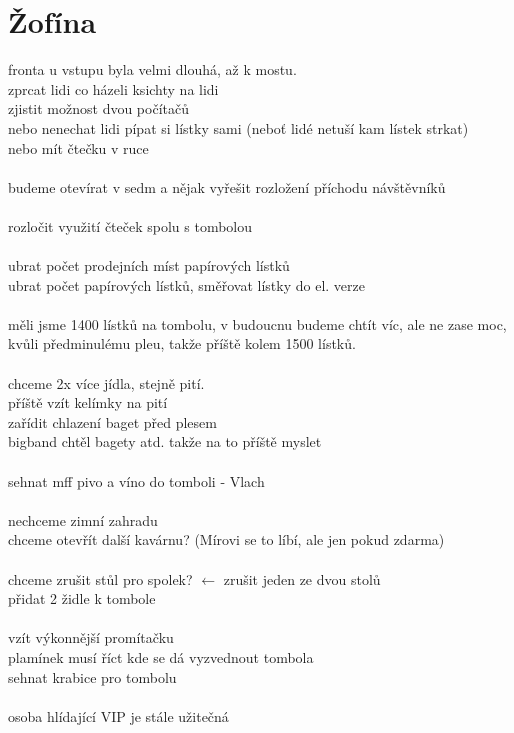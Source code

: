 \documentclass[10pt,a4paper]{article}
\begin{document}
\section{Žofína}
fronta u vstupu byla velmi dlouhá, až k mostu.\\
zprcat lidi co házeli ksichty na lidi\\
zjistit možnost dvou počítačů\\
nebo nenechat lidi pípat si lístky sami
(neboť lidé netuší kam lístek strkat)\\
nebo mít čtečku v ruce\\
\\
budeme otevírat v sedm a nějak vyřešit
rozložení příchodu návštěvníků\\
\\
rozločit využití čteček spolu s tombolou\\
\\
ubrat počet prodejních míst papírových lístků\\
ubrat počet papírových lístků,
směřovat lístky do el. verze\\
\\
měli jsme 1400 lístků na tombolu, v budoucnu budeme chtít víc,
ale ne zase moc, kvůli předminulému pleu, takže příště
kolem 1500 lístků.\\
\\
chceme 2x více jídla, stejně pití.\\
příště vzít kelímky na pití\\
zařídit chlazení baget před plesem\\
bigband chtěl bagety atd. takže na to příště myslet\\
\\
sehnat mff pivo a víno do tomboli - Vlach\\
\\
nechceme zimní zahradu\\
chceme otevřít další kavárnu?
(Mírovi se to líbí, ale jen pokud zdarma)\\
\\
chceme zrušit stůl pro spolek?
$\leftarrow$ zrušit jeden ze dvou stolů\\
přidat 2 židle k tombole\\
\\
vzít výkonnější promítačku\\
plamínek musí říct kde se dá vyzvednout tombola\\
sehnat krabice pro tombolu\\
\\
osoba hlídající VIP je stále užitečná\\
\end{document}
